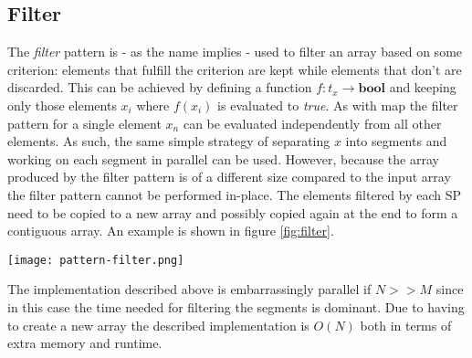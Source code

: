 \subsection{Filter}
The \textit{filter} pattern is - as the name implies - used to filter an array based on some criterion:
elements that fulfill the criterion are kept while elements that don't are discarded.
This can be achieved by defining a function $f: t_x \rightarrow \textbf{bool}$ and keeping only those elements $x_i$
where $f(x_i)$ is evaluated to \textit{true}.
As with map the filter pattern for a single element $x_n$ can be evaluated independently from all other elements.
As such, the same simple strategy of separating $x$ into segments and working on each segment in parallel can be used.
However, because the array produced by the filter pattern is of a different size
compared to the input array the filter pattern cannot be performed in-place.
The elements filtered by each SP need to be copied to a new array and possibly copied again at the end to form a contiguous array.
An example is shown in figure \ref{fig:filter}.
\begin{figure*}
	\centering
	\texttt{[image: pattern-filter.png]}
	\caption{
		Visualization of the filter pattern.
		Only integers smaller than 4 are accepted.
		The operation is not in-place.
	}
	\label{fig:filter}
\end{figure*}

The implementation described above is embarrassingly parallel if $N >> M$
since in this case the time needed for filtering the segments is dominant.
Due to having to create a new array the described implementation is $O(N)$ both in terms of extra memory and runtime.
